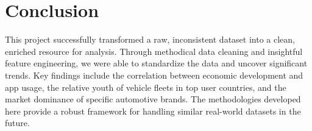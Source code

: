 \documentclass{article}
\begin{document}
\section{Conclusion}
This project successfully transformed a raw, inconsistent dataset into a clean, enriched resource for analysis. Through methodical data cleaning and insightful feature engineering, we were able to standardize the data and uncover significant trends. Key findings include the correlation between economic development and app usage, the relative youth of vehicle fleets in top user countries, and the market dominance of specific automotive brands. The methodologies developed here provide a robust framework for handling similar real-world datasets in the future.
\end{document}
